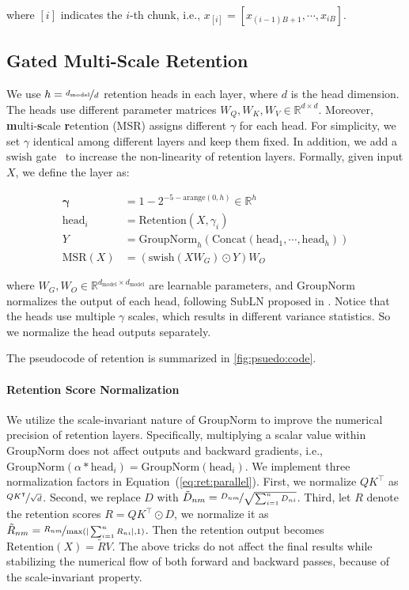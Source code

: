 where ${[i]}$ indicates the $i$-th chunk, i.e., $x_{[i]} = [x_{(i-1)B+1} , \cdots , x_{iB}]$.

\subsection{Gated Multi-Scale Retention}
\label{sec:multiscale}

We use $h = \nicefrac{d_\text{model}}{d}$ retention heads in each layer, where $d$ is the head dimension. The heads use different parameter matrices $W_Q, W_K, W_V \in \mathbb{R}^{d\times d}$. Moreover, \textbf{m}ulti-\textbf{s}cale \textbf{r}etention (MSR) assigns different $\gamma$ for each head. For simplicity, we set $\gamma$ identical among different layers and keep them fixed. In addition, we add a $\mathrm{swish}$ gate~\cite{gelu,swish} to increase the non-linearity of retention layers. Formally, given input $X$, we define the layer as:

\begin{equation}
\begin{aligned}
\label{eq:msr}
\mathbf{\gamma} &= 1 - 2^{-5-\mathrm{arange}(0, h)} \in \mathbb{R}^{h} \\
\mathrm{head}_i &= \mathrm{Retention}(X, \gamma_i) \\
Y &= \mathrm{GroupNorm}_{h}( \mathrm{Concat}(\mathrm{head}_1, \cdots, \mathrm{head}_h) ) \\
\mathrm{MSR}(X) &= (\mathrm{swish}(X W_G) \odot Y) W_O
\end{aligned}
\end{equation}

where $W_G, W_O \in \mathbb{R}^{d_\text{model}\times d_\text{model}}$ are learnable parameters, and $\mathrm{GroupNorm}$~\cite{groupnorm} normalizes the output of each head, following SubLN proposed in \cite{megatron}. Notice that the heads use multiple $\gamma$ scales, which results in different variance statistics. So we normalize the head outputs separately.

The pseudocode of retention is summarized in \ref{fig:psuedo:code}.

\paragraph{Retention Score Normalization} We utilize the scale-invariant nature of $\mathrm{GroupNorm}$ to improve the numerical precision of retention layers. Specifically, multiplying a scalar value within $\mathrm{GroupNorm}$ does not affect outputs and backward gradients, i.e., $\mathrm{GroupNorm}(\alpha * \mathrm{head}_i) = \mathrm{GroupNorm}(\mathrm{head}_i)$.
We implement three normalization factors in Equation~(\ref{eq:ret:parallel}).
First, we normalize $Q K^\intercal$ as $\nicefrac{Q K^\intercal}{\sqrt{d}}$.
Second, we replace $D$ with $\tilde{D}_{nm} = \nicefrac{D_{nm}}{\sqrt{\sum_{i=1}^{n}D_{ni}}}$.
Third, let $R$ denote the retention scores $R=QK^\intercal \odot D$, we normalize it as $\tilde{R}_{nm} = \nicefrac{R_{nm}}{\max(| \sum_{i=1}^{n} R_{ni} |, 1)}$. Then the retention output becomes $\mathrm{Retention}(X) = \tilde{R} V$. The above tricks do not affect the final results while stabilizing the numerical flow of both forward and backward passes, because of the scale-invariant property.

